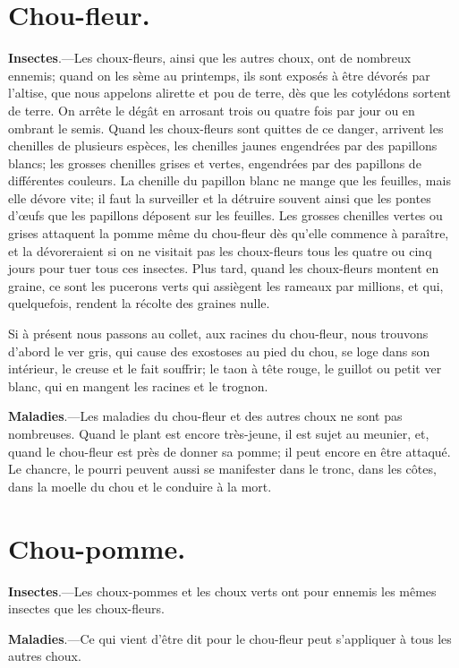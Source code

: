 \documentclass[10pt,a4paper]{book}
\begin{document}
\section{Chou-fleur.}

\textbf{Insectes}.---Les choux-fleurs, ainsi que les autres choux, ont de nombreux ennemis; quand on les sème au printemps, ils sont exposés à être dévorés par l'altise, que nous appelons alirette et pou de terre, dès que les cotylédons sortent de terre. On arrête le dégât en arrosant trois ou quatre fois par jour ou en ombrant le semis. Quand les choux-fleurs sont quittes de ce danger, arrivent les chenilles de plusieurs espèces, les chenilles jaunes engendrées par des papillons blancs; les grosses chenilles grises et vertes, engendrées par des papillons de différentes couleurs. La chenille du papillon blanc ne mange que les feuilles, mais elle dévore vite; il faut la surveiller et la détruire souvent ainsi que les pontes d'œufs que les papillons déposent sur les feuilles. Les grosses chenilles vertes ou grises attaquent la pomme même du chou-fleur dès qu'elle commence à paraître, et la dévoreraient si on ne visitait pas les choux-fleurs tous les quatre ou cinq jours pour tuer tous ces insectes. Plus tard, quand les choux-fleurs montent en graine, ce sont les pucerons verts qui assiègent les rameaux par millions, et qui, quelquefois, rendent la récolte des graines nulle.

Si à présent nous passons au collet, aux racines du chou-fleur, nous trouvons d'abord le ver gris, qui cause des exostoses au pied du chou, se loge dans son intérieur, le creuse et le fait souffrir; le taon à tête rouge, le guillot ou petit ver blanc, qui en mangent les racines et le trognon.

\textbf{Maladies}.---Les maladies du chou-fleur et des autres choux ne sont pas nombreuses. Quand le plant est encore très-jeune, il est sujet au meunier, et, quand le chou-fleur est près de donner sa pomme; il peut encore en être attaqué. Le chancre, le pourri peuvent aussi se manifester dans le tronc, dans les côtes, dans la moelle du chou et le conduire à la mort.

\section{Chou-pomme.}

\textbf{Insectes}.---Les choux-pommes et les choux verts ont pour ennemis les mêmes insectes que les choux-fleurs.

\textbf{Maladies}.---Ce qui vient d'être dit pour le chou-fleur peut s'appliquer à tous les autres choux.
\end{document}
